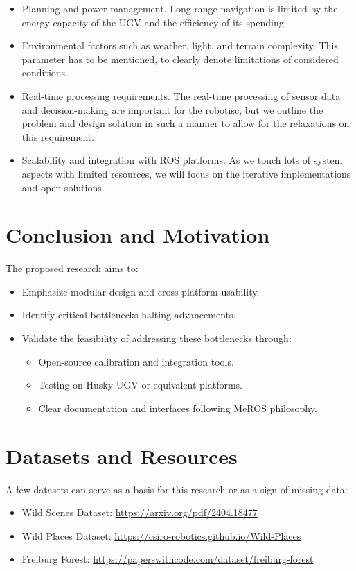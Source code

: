\documentclass[runningheads]{llncs}
\begin{document}
\begin{itemize}
  \item Planning and power management.
        Long-range navigation is limited by the energy capacity of the UGV and the efficiency of its spending.
  \item Environmental factors such as weather, light, and terrain complexity.
        This parameter has to be mentioned, to clearly denote limitations of considered conditions.
  \item Real-time processing requirements.
        The real-time processing of sensor data and decision-making are important for the robotisc, but we outline the problem and design solution in such a manner to allow for the relaxations on this requirement.
  \item Scalability and integration with ROS platforms.
        As we touch lots of system aspects with limited resources, we will focus on the iterative implementations and open solutions.
\end{itemize}

\section{Conclusion and Motivation}
The proposed research aims to:
\begin{itemize}
  \item Emphasize modular design and cross-platform usability.
  \item Identify critical bottlenecks halting advancements.
  \item Validate the feasibility of addressing these bottlenecks through:
        \begin{itemize}
          \item Open-source calibration and integration tools.
          \item Testing on Husky UGV or equivalent platforms.
          \item Clear documentation and interfaces following MeROS philosophy.
        \end{itemize}
\end{itemize}

\section{Datasets and Resources}
A few datasets can serve as a basis for this research or as a sign of missing data:
\begin{itemize}
  \item Wild Scenes Dataset: \url{https://arxiv.org/pdf/2404.18477}
  \item Wild Places Dataset: \url{https://csiro-robotics.github.io/Wild-Places}
  \item Freiburg Forest: \url{https://paperswithcode.com/dataset/freiburg-forest}
\end{itemize}


\printbibliography
\end{document}
